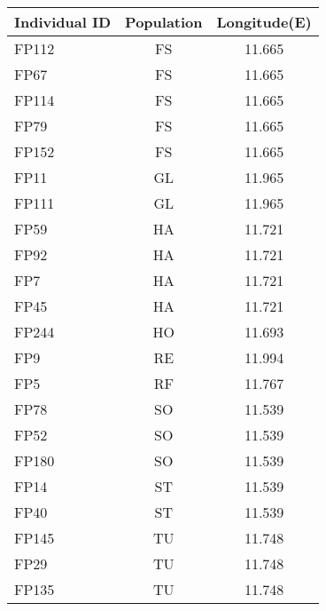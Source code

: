 \documentclass[12pt]{amsart}
\begin{document}
\begin{table}
\begin{tabular}{l|c|c}
Individual ID \citep{Turner2014} & Population \citep{Turner2011} & Longitude(E)\\
\hline
FP112 & FS&11.665\\
FP67 & FS &11.665\\
FP114 & FS &11.665\\
FP79 & FS &11.665\\
FP152 &  FS &11.665\\
FP11 & GL &11.965\\
FP111&GL &11.965\\
FP59 & HA  &11.721\\
FP92 & HA &11.721\\
FP7 &  HA  & 11.721\\
FP45 & HA&11.721\\
FP244& HO &11.693\\
FP9&   RE&11.994\\
FP5 &  RF&11.767\\
FP78 &  SO &11.539\\
FP52 &  SO &11.539\\
FP180& SO &11.539\\
FP14 & ST&11.539\\
FP40 & ST&11.539\\
FP145 & TU&11.748\\
FP29&  TU&11.748\\
FP135& TU&11.748\\

\end{tabular}
\end{table}
\end{document}
